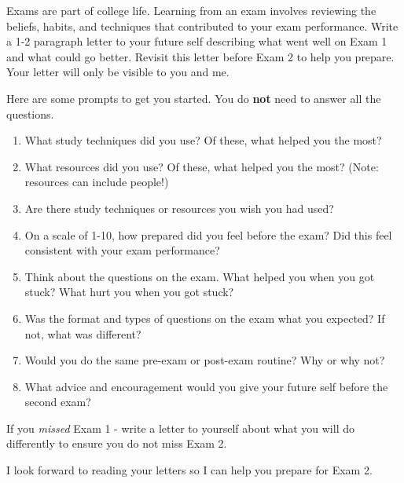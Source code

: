 \documentclass[12pt]{memoir}
\begin{document}
Exams are part of college life. Learning from an exam involves reviewing the beliefs, habits, and techniques that contributed to your exam performance. Write a 1-2 paragraph letter to your future self describing what went well on Exam 1 and what could go better. Revisit this letter before Exam 2 to help you prepare. Your letter will only be visible to you and me.\par
Here are some prompts to get you started. You do \textbf{not} need to answer all the questions.

\begin{enumerate}
    \item What study techniques did you use? Of these, what helped you the most?

    \item What resources did you use? Of these, what helped you the most? (Note: resources can include people!)
    
    \item Are there study techniques or resources you wish you had used?
    
    \item On a scale of 1-10, how prepared did you feel before the exam? Did this feel consistent with your exam performance?
    
    \item Think about the questions on the exam. What helped you when you got stuck? What hurt you when you got stuck?
    
    \item Was the format and types of questions on the exam what you expected? If not, what was different?
    
    \item Would you do the same pre-exam or post-exam routine? Why or why not?
    
    \item What advice and encouragement would you give your future self before the second exam?
\end{enumerate}

If you \emph{missed} Exam 1 - write a letter to yourself about what you will do differently to ensure you do not miss Exam 2.\par

I look forward to reading your letters so I can help you prepare for Exam 2.
\end{document}
